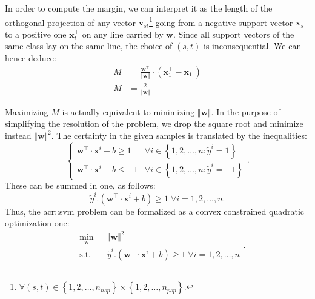                 In order to compute the margin, we can interpret it as the length of the orthogonal projection of any vector $\bm{v}_{st}$\footnote{$\forall (s, t) \in \left\{1,2,\dots,n_{nsp}\right\} \times \left\{1,2,\dots,n_{psp}\right\}$.} going from a negative support vector $\bm{x}^-_s$ to a positive one $\bm{x}^+_t$ on any line carried by $\bm{w}$.
                Since all support vectors of the same class lay on the same line, the choice of $(s,t)$ is inconsequential.
                We can hence deduce:
                \begin{align}
                    M &= \frac{\bm{w}^\intercal}{\Vert\bm{w}\Vert} \cdot (\bm{x}^+_1 - \bm{x}^-_1) \nonumber \\
                    M &= \frac{2}{\Vert\bm{w}\Vert}
                \end{align}

                Maximizing $M$ is actually equivalent to minimizing $\Vert\bm{w}\Vert$.
                In the purpose of simplifying the resolution of the problem, we drop the square root and minimize instead $\Vert\bm{w}\Vert^2$.
                The certainty in the given samples is translated by the inequalities:
                \begin{equation*}
                    \begin{cases}
                        \bm{w}^\intercal\cdot\bm{x}^i + b \geq 1 & \forall i \in \left\{1, 2, \dots, n: \tilde{y}^i = 1\right\}\\
                        \bm{w}^\intercal\cdot\bm{x}^i + b \leq -1 & \forall i \in \left\{1, 2, \dots, n: \tilde{y}^i = -1\right\}
                    \end{cases}.
                \end{equation*}
                These can be summed in one, as follows:
                \begin{equation}
                    \label{eq::hard_margin}
                    \tilde{y}^i.(\bm{w}^\intercal\cdot\bm{x}^i + b) \geq 1 \; \forall i = 1, 2, \dots, n.
                \end{equation}
                Thus, the \gls{acr::svm} problem can be formalized as a convex constrained quadratic optimization one:
                \begin{equation}
                    \label{eq::hard_svm_primal}
                    \begin{aligned}
                        & \min_{\bm{w}}
                        & & {\Vert \bm{w} \Vert}^2 \\
                        & \text{s.t.}
                        & & \tilde{y}^i.(\bm{w}^\intercal\cdot\bm{x}^i + b) \geq 1 \; \forall i = 1, 2, \dots, n
                    \end{aligned}.
                \end{equation}

